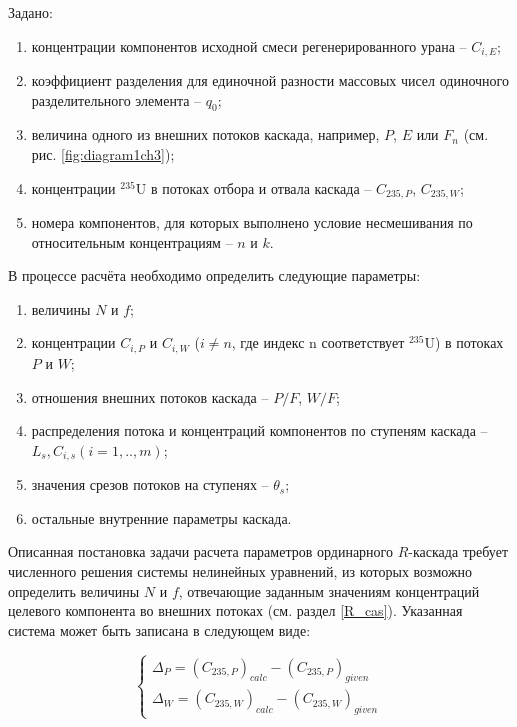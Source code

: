 Задано: 

\begin{enumerate}
  \item концентрации компонентов исходной смеси регенерированного урана -- ${C}_{i,E}$;
  \item коэффициент разделения для единочной разности массовых чисел одиночного разделительного элемента -- ${q}_{0}$;
  \item величина одного из внешних потоков каскада, например, $P$, $E$ или $F_n$ (см. рис. \ref{fig:diagram1ch3});
  \item концентрации $^{235}$U в потоках отбора и отвала каскада -- ${C_{235, P}}$, ${C_{235, W}}$;
  \item номера компонентов, для которых выполнено условие несмешивания по относительным концентрациям -- $n$ и $k$.
\end{enumerate}

В процессе расчёта необходимо определить следующие параметры: 

\begin{enumerate}
  \item величины $N$ и $f$;
  \item концентрации ${C}_{i,P}$ и ${C}_{i,W}$ ($i \neq n$, где индекс n соответствует $^{235}$U) в потоках $P$ и $W$; 
  \item отношения внешних потоков каскада -- $P/F$, $W/F$;
  \item распределения потока и концентраций компонентов по ступеням каскада -- $L_{s}, C_{i,s} (i = 1,.., m)$;
  \item значения срезов потоков на ступенях -- $\theta_{s}$;
  \item остальные внутренние параметры каскада. 
\end{enumerate}

Описанная постановка задачи расчета параметров ординарного $R$-каскада требует численного решения системы нелинейных уравнений, из которых возможно определить величины $N$ и $f$, отвечающие заданным значениям концентраций целевого компонента во внешних потоках (см. раздел \ref{R_cas}). Указанная система может быть записана в следующем виде: 

\begin{equation}\label{dpdw}
  \begin{cases}
  \Delta_{P} = {(C_{235, P})}_{calc}-{(C_{235, P})}_{given}\\
  \Delta_{W} = {(C_{235, W})}_{calc}-{(C_{235, W})}_{given}
  \end{cases}\,
\end{equation}

